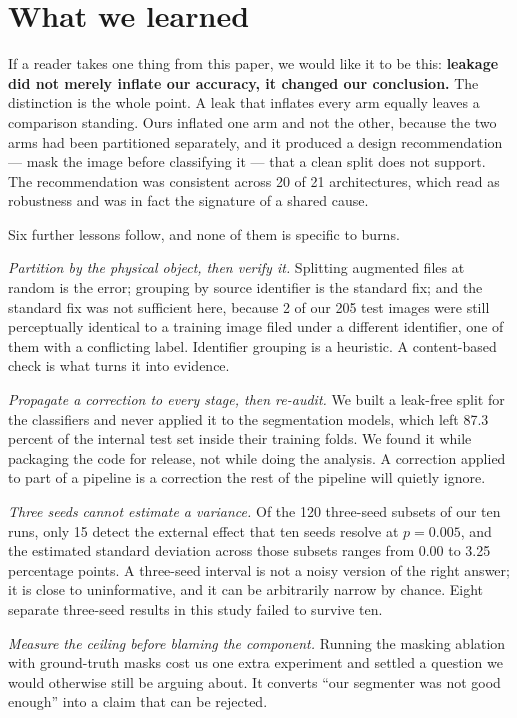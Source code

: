 \documentclass{melba}
\begin{document}
\section{What we learned}
\label{Learn}
If a reader takes one thing from this paper, we would like it to be this: \textbf{leakage did not merely inflate our accuracy, it changed our conclusion.} The distinction is the whole point. A leak that inflates every arm equally leaves a comparison standing. Ours inflated one arm and not the other, because the two arms had been partitioned separately, and it produced a design recommendation --- mask the image before classifying it --- that a clean split does not support. The recommendation was consistent across 20 of 21 architectures, which read as robustness and was in fact the signature of a shared cause.

Six further lessons follow, and none of them is specific to burns.

\emph{Partition by the physical object, then verify it.} Splitting augmented files at random is the error; grouping by source identifier is the standard fix; and the standard fix was not sufficient here, because 2 of our 205 test images were still perceptually identical to a training image filed under a different identifier, one of them with a conflicting label. Identifier grouping is a heuristic. A content-based check is what turns it into evidence.

\emph{Propagate a correction to every stage, then re-audit.} We built a leak-free split for the classifiers and never applied it to the segmentation models, which left 87.3 percent of the internal test set inside their training folds. We found it while packaging the code for release, not while doing the analysis. A correction applied to part of a pipeline is a correction the rest of the pipeline will quietly ignore.

\emph{Three seeds cannot estimate a variance.} Of the 120 three-seed subsets of our ten runs, only 15 detect the external effect that ten seeds resolve at $p=0.005$, and the estimated standard deviation across those subsets ranges from 0.00 to 3.25 percentage points. A three-seed interval is not a noisy version of the right answer; it is close to uninformative, and it can be arbitrarily narrow by chance. Eight separate three-seed results in this study failed to survive ten.

\emph{Measure the ceiling before blaming the component.} Running the masking ablation with ground-truth masks cost us one extra experiment and settled a question we would otherwise still be arguing about. It converts ``our segmenter was not good enough'' into a claim that can be rejected.
\end{document}
